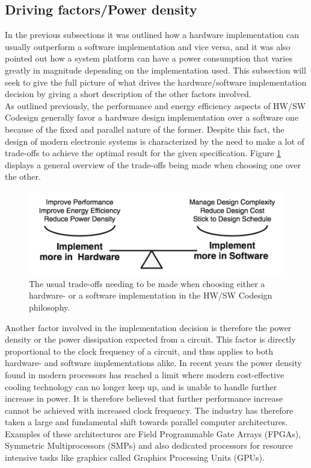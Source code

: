 \subsection{Driving factors/Power density}
In the previous subsections it was outlined how a hardware implementation can usually outperform a software implementation and vice versa, and it was also pointed out how a system platform can have a power consumption that varies greatly in magnitude depending on the implementation used. This subsection will seek to give the full picture of what drives the hardware/software implementation decision by giving a short description of the other factors involved. 
\\
\noindent
As outlined previously, the performance and energy efficiency aspects of HW/SW Codesign generally favor a hardware design implementation over a software one because of the fixed and parallel nature of the former. Despite this fact, the design of modern electronic systems is characterized by the need to make a lot of trade-offs to achieve the optimal result for the given specification. Figure \ref{HWSWTradeoffs} displays a general overview of the trade-offs being made when choosing one over the other. 


\begin{figure}[H]
    \begin{center}
        \includegraphics[scale=0.52]{Attachments/HWSWTradeoffs.png}
        \caption{The usual trade-offs needing to be made when choosing either a hardware- or a software implementation in the HW/SW Codesign philosophy. }
        \label{HWSWTradeoffs}
    \end{center}
\end{figure}
\hfill\break
\hfill\break
\noindent
Another factor involved in the implementation decision is therefore the power density or the power dissipation expected from a circuit. This factor is directly proportional to the clock frequency of a circuit, and thus applies to both hardware- and software implementations alike. In recent years the power density found in modern processors has reached a limit where modern cost-effective cooling technology can no longer keep up, and is unable to handle further increase in power. It is therefore believed that further performance increase cannot be achieved with increased clock frequency. The industry has therefore taken a large and fundamental shift towards parallel computer architectures. Examples of these architectures are Field Programmable Gate Arrays (FPGAs), Symmetric Multiprocessors (SMPs) and also dedicated processors for resource intensive tasks like graphics called Graphics Processing Units (GPUs).
\\
\noindent
